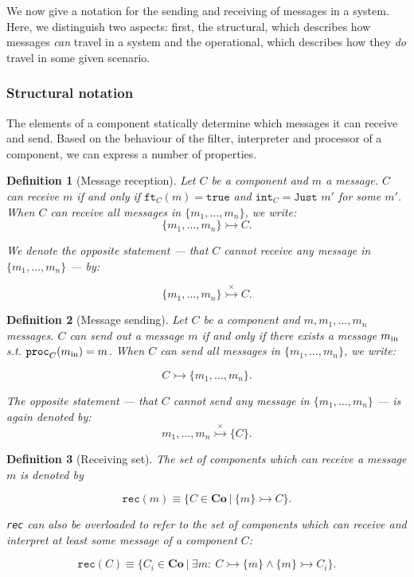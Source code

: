 \documentclass[]{scrartcl}
\theoremstyle{break}
\newtheorem{definition}{Definition}
\newcommand{\mt}[1]{\textnormal{#1}}
\renewcommand{\tt}[1]{\texttt{#1}}
\newcommand{\co}{\mathbf{Co}}
\newcommand{\cansend}[2]{#1 \rightarrowtail \{#2\}}
\newcommand{\cantsend}[2]{#1 \stackrel{\times}{\rightarrowtail} \{#2\}}
\newcommand{\canrec}[2]{\{#1\} \rightarrowtail #2}
\newcommand{\cantrec}[2]{\{#1\} \stackrel{\times}{\rightarrowtail} #2}
\newcommand{\rec}[1]{\tt{rec}(#1)}
\newcommand{\ft}[1]{\tt{ft}_{#1}}
\renewcommand{\int}[1]{\tt{int}_{#1}}
\newcommand{\proc}[1]{\tt{proc}_{#1}}
\begin{document}
We now give a notation for the sending and receiving of messages in a system. Here, we distinguish two aspects: first, the structural, which describes how messages {\em can} travel in a system and the operational, which describes how they {\em do} travel in some given scenario.

\subsubsection{Structural notation}

The elements of a component statically determine which messages it can receive and send. Based on the behaviour of the filter, interpreter and processor of a component, we can express a number of properties.

\begin{definition}[Message reception]
	Let $C$ be a component and $m$ a message. $C$ can receive $m$ if and only if $\ft{C}(m) = \tt{true}$ and $\int{C} = \tt{Just } m'$ for some $m'$.
	When $C$ can receive all messages in $\{m_1,\dots,m_n\}$, we write:
	$$
		\canrec{m_1,\dots,m_n}{C}.
	$$
	
	We denote the opposite statement --- that $C$ cannot receive any message in $\{m_1,\dots,m_n\}$ --- by:
	
	$$
		\cantrec{m_1,\dots,m_n}{C}.
	$$
\end{definition}

\begin{definition}[Message sending]
	Let $C$ be a component and $m, m_1,\dots,m_n$ messages. $C$ can send out a message $m$ if and only if there exists a message $m_{\mt{in}}$ s.t. $\proc{C}(m_{\mt{in}}) = m$.
	When $C$ can send all messages in $\{m_1,\dots,m_n\}$, we write:
	
	$$
		\cansend{C}{m_1,\dots,m_n}.
	$$
	
	The opposite statement --- that $C$ cannot send any message in $\{m_1,\dots,m_n\}$ --- is again denoted by:
	$$
		\cantsend{m_1,\dots,m_n}{C}.
	$$
\end{definition}

\begin{definition}[Receiving set]
	The set of components which can receive a message $m$ is denoted by
	
	$$
		\rec{m} \equiv \{C \in \co\ |\ \canrec{m}{C} \}.
	$$
	
	\tt{rec} can also be overloaded to refer to the set of components which can receive and interpret at least some message of a component $C$:
	
$$
	\rec{C} \equiv \{C_i \in \co\ |\ \exists m:\ \cansend{C}{m} \wedge \canrec{m}{C_i} \}.
$$
\end{definition}
\end{document}
